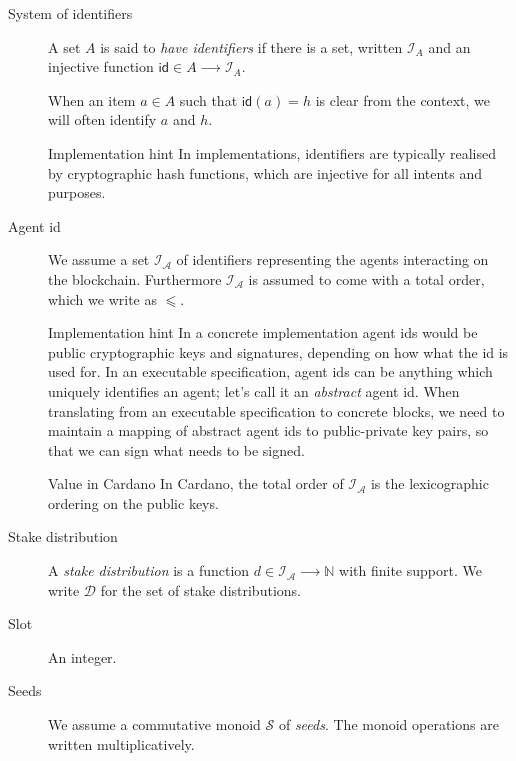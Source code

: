 \documentclass{article}
\newenvironment{currentvalue}{\begin{bclogo}[noborder=true,
    logo=\bcinfo, epBarre=3, couleurBarre=YellowOrange]{Value in Cardano}}{\end{bclogo}}
\newenvironment{implementationhint}{\begin{bclogo}[noborder=true,
    logo=\bccrayon, epBarre=3, couleurBarre=PineGreen]{Implementation hint}}{\end{bclogo}}
\newcommand{\idsof}[1]{\mathcal{I}\!_#1}
\newcommand{\id}{\mathsf{id}}
\newcommand{\agentids}{\idsof{\mathcal{A}}}
\newcommand{\stakedistributions}{\mathcal{D}}
\newcommand{\seeds}{\mathcal{S}}
\begin{document}
\begin{description}
\item[System of identifiers] A set $A$ is said to \emph{have
    identifiers} if there is a set, written $\idsof{A}$ and an
  injective function $\id ∈ A ⟶ \idsof{A}$.

  When an item $a∈A$ such that $\id(a) = h$ is clear from the context,
  we will often identify $a$ and $h$.

  \begin{implementationhint}
    In implementations, identifiers are typically realised by
    cryptographic hash functions, which are injective for all intents
    and purposes.
  \end{implementationhint}

\item[Agent id] We assume a set $\agentids$ of identifiers
  representing the agents interacting on the blockchain. Furthermore
  $\agentids$ is assumed to come with a total order, which we write as
  $⩽$.
  \begin{implementationhint}
    In a concrete implementation agent ids would be public
    cryptographic keys and signatures, depending on how what the id is
    used for. In an executable specification, agent ids can be
    anything which uniquely identifies an agent; let's call it an
    \emph{abstract} agent id. When translating from an executable
    specification to concrete blocks, we need to maintain a mapping of
    abstract agent ids to public-private key pairs, so that we can
    sign what needs to be signed.
  \end{implementationhint}
  
  \begin{currentvalue}
    In Cardano, the total order of $\agentids$ is the lexicographic
    ordering on the public keys.
  \end{currentvalue}

\item[Stake distribution] A \emph{stake distribution} is a function
  $d ∈ \agentids ⟶ ℕ$ with finite support. We write
  $\stakedistributions$ for the set of stake distributions.

\item[Slot] An integer.

\item[Seeds] We assume a commutative monoid $\seeds$ of \emph{seeds}. The monoid
  operations are written multiplicatively.


\end{description}
\end{document}
